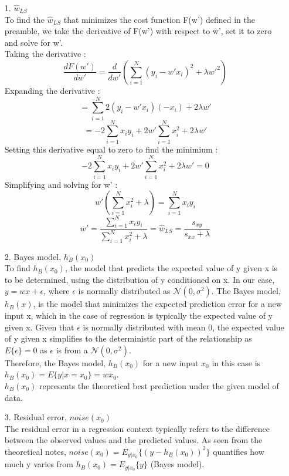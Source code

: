 \documentclass[12pt,titlepage]{article}
\begin{document}
\begin{enumerate}
    \item[1.] $\hat{w}_{LS}$ \\
    To find the $\hat{w}_{LS}$ that minimizes the cost function F(w') defined in the preamble, we take the derivative of F(w') with respect to w', set it to zero and solve for w'.\\
    Taking the derivative : $$ \frac{d F(w')}{dw'} = \frac{d}{dw'}(\sum_{i=1}^{N}(y_{i}-w'x_{i})^{2} + \lambda w'^{2})$$
    Expanding the derivative : $$ = \sum_{i=1}^{N} 2(y_{i}-w'x_{i})(-x_{i}) + 2 \lambda w' $$
    $$ = -2 \sum_{i=1}^{N}x_{i}y_{i} + 2w'\sum_{i=1}^{N}x_{i}^{2} + 2 \lambda w' $$
    Setting this derivative equal to zero to find the minimium : $$ -2 \sum_{i=1}^{N}x_{i}y_{i} + 2w'\sum_{i=1}^{N}x_{i}^{2} + 2 \lambda w' = 0 $$
    Simplifying and solving for w' : 
    $$ w'(\sum_{i=1}^{N}x_{i}^{2} + \lambda) = \sum_{i=1}^{N}x_{i}y_{i} $$
    $$ w' = \frac{\sum_{i=1}^{N}x_{i}y_{i}}{\sum_{i=1}^{N}x_{i}^{2} + \lambda} = \hat{w}_{LS} = \frac{s_{xy}}{s_{xx} + \lambda}$$
    \item[2.] Bayes model, $h_{B}(x_{0})$ \\
    To find $h_{B}(x_{0})$, the model that predicts the expected value of y given x is to be determined, using the distribution of y conditioned on x. In our case, $y = wx + \epsilon$, where $\epsilon$ is normally distributed as $\mathcal{N}(0,\sigma^{2})$. The Bayes model, $h_{B}(x)$, is the model that minimizes the expected prediction error for a new input x, which in the case of regression is typically the expected value of y given x. Given that $\epsilon$ is normally distributed with mean 0, the expected value of y given x simplifies to the deterministic part of the relationship as $E\{\epsilon\} = 0$ as $\epsilon$ is from a $\mathcal{N}(0, \sigma^{2})$.\\
    Therefore, the Bayes model, $h_{B}(x_{0})$ for a new input $x_{0}$ in this case is $h_{B}(x_{0}) = E\{y|x=x_{0}\} = wx_{0}$. \\
    $h_{B}(x_{0})$ represents the theoretical best prediction under the given model of data.
     \item[3.] Residual error, $noise(x_{0})$ \\
     The residual error in a regression context typically refers to the difference between the observed values and the predicted values.
     As seen from the theoretical notes, $noise(x_{0}) = E_{y|x_{0}}\{(y-h_{B}(x_{0}))^{2}\}$ quantifies how much y varies from $h_{B}(x_{0}) = E_{y|x_{0}}\{y\}$ (Bayes model).

\end{enumerate}
\end{document}
